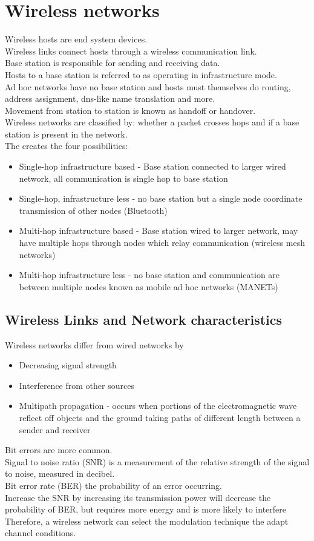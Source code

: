 \documentclass[12pt, a4paper]{article}
\begin{document}
	\section{Wireless networks}
		Wireless hosts are end system devices.\\
		Wireless links connect hosts through a wireless communication link.\\
		Base station is responsible for sending and receiving data.\\
		Hosts to a base station is referred to as operating in infrastructure mode.\\
		Ad hoc networks have no base station and hosts must themselves do routing, address assignment, dns-like name translation and more.\\
		Movement from station to station is known as handoff or handover.\\
		Wireless networks are classified by: whether a packet crosses hops and if a base station is present in the network.\\
		The creates the four possibilities:
		\begin{itemize}
			\item Single-hop infrastructure based - Base station connected to larger wired network, all communication is single hop to base station
			\item Single-hop, infrastructure less - no base station but a single node coordinate transmission of other nodes (Bluetooth)
			\item Multi-hop infrastructure based - Base station wired to larger network, may have multiple hops through nodes which relay communication (wireless mesh networks)
			\item Multi-hop infrastructure less - no base station and communication are between multiple nodes known as mobile ad hoc networks (MANETs)
		\end{itemize}
		\subsection{Wireless Links and Network characteristics}
			Wireless networks differ from wired networks by
			\begin{itemize}
				\item Decreasing signal strength
				\item Interference from other sources
				\item Multipath propagation - occurs when portions of the electromagnetic wave reflect off objects and the ground taking paths of different length between a sender and receiver
			\end{itemize}
			Bit errors are more common.\\
			Signal to noise ratio (SNR) is a measurement of the relative strength of the signal to noise, measured in decibel.\\
			Bit error rate (BER) the probability of an error occurring.\\
			Increase the SNR by increasing its transmission power will decrease the probability of BER, but requires more energy and is more likely to interfere\\
			Therefore, a wireless network can select the modulation technique the adapt channel conditions.\\
\end{document}
